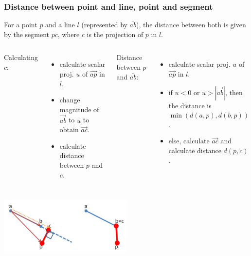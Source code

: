 \begin{frame}
  \frametitle{Distance between point and line, point and segment}
  \begin{block}{}
    For a point $p$ and a line $l$ (represented by $\overline{ab}$), the distance between both is given by the segment $pc$, where $c$ is the projection of $p$ in $l$.\bigskip

    {\smaller
    \begin{columns}[T]
      Calculating $c$:
      \begin{itemize}
        \item calculate scalar proj. $u$ of $\vec{ap}$ in $l$.
        \item change magnitude of $\vec{ab}$ to $u$ to obtain $\vec{ac}$.
        \item calculate distance between $p$ and $c$.
      \end{itemize}
      Distance between $p$ and $\overline{ab}$:
      \begin{itemize}
        \item calculate scalar proj. $u$ of $\vec{ap}$ in $l$.
        \item if $u < 0$ or $u > |\vec{ab}|$, then the distance is $\min(d(a,p),d(b,p))$.
        \item else, calculate $\vec{ac}$ and calculate distance $d(p,c)$.
      \end{itemize}
    \end{columns}}
  \end{block}

  \begin{center}
    \includegraphics[width=0.5\textwidth]{../img/geom5}
  \end{center}
\end{frame}

